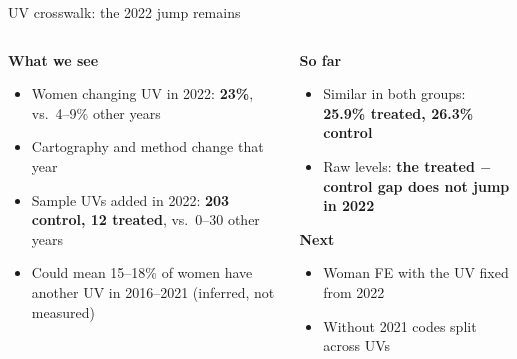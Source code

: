 \documentclass[aspectratio=169,10pt]{beamer}
\newcommand{\takeaway}[1]{\par\vspace{6pt}{\small\textcolor{steel}{$\Rightarrow$}\ \textbf{\textcolor{navy}{#1}}}}
\begin{document}
\begin{frame}{UV crosswalk: the 2022 jump remains}
\begin{columns}[T]
\begin{column}{0.50\textwidth}
{\small\textcolor{steel}{\textbf{What we see}}}
\begin{itemize}
  \footnotesize
  \item Women changing UV in 2022: \textbf{23\%}, vs.\ 4--9\% other years
  \item Cartography and method change that year
  \item Sample UVs added in 2022: \textbf{203 control, 12 treated}, vs.\ 0--30 other years
  \item Could mean 15--18\% of women have another UV in 2016--2021 (inferred, not measured)
\end{itemize}
\end{column}
\begin{column}{0.46\textwidth}
{\small\textcolor{steel}{\textbf{So far}}}
\begin{itemize}
  \footnotesize
  \item Similar in both groups: \textbf{25.9\% treated, 26.3\% control}
  \item Raw levels: \textbf{the treated $-$ control gap does not jump in 2022}
\end{itemize}
\vspace{2pt}
{\small\textcolor{steel}{\textbf{Next}}}
\begin{itemize}
  \footnotesize
  \item Woman FE with the UV fixed from 2022
  \item Without 2021 codes split across UVs
\end{itemize}
\end{column}
\end{columns}
\takeaway{In raw levels, results do not seem driven by 2022, but this jump needs a deeper look.}
\end{frame}
\end{document}
